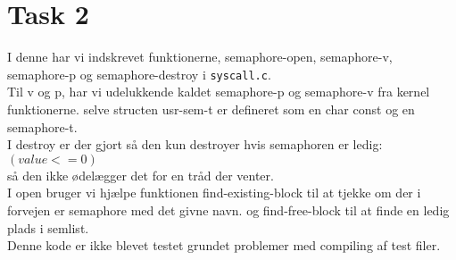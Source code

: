 \documentclass[a4paper,12pt]{article}
\begin{document}
\section*{Task 2}
I denne har vi indskrevet funktionerne, semaphore-open, semaphore-v, semaphore-p
og semaphore-destroy i \texttt{syscall.c}. \\
Til v og p, har vi udelukkende kaldet semaphore-p og semaphore-v fra kernel funktionerne.
selve structen usr-sem-t er defineret som en char const\* og en semaphore-t. \\
I destroy er der gjort så den kun destroyer hvis semaphoren er ledig: \\
$(value <= 0)$ \\ 
så den ikke ødelægger det for en tråd der venter. \\
I open bruger vi hjælpe funktionen find-existing-block til at tjekke
om der i forvejen er semaphore med det givne navn. og find-free-block til at 
finde en ledig plads i semlist. \\
Denne kode er ikke blevet testet grundet problemer med compiling af test filer.
\end{document}
